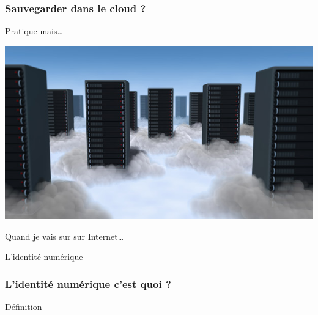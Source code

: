 \documentclass{beamer}
\begin{document}
\begin{frame}
\frametitle{Sauvegarder dans le cloud ?}

\begin{block}{Pratique mais…}
\begin{itemize}
\end{itemize}
\end{block}

\begin{center}
\includegraphics[scale=0.4] {./images/cloud_data_center.jpg}
\end{center}

\end{frame}

\begin{frame}
\begin{center}
\Huge{Quand je vais sur sur Internet…}
\end{center}
\end{frame}

\begin{frame}
\begin{center}
\Huge{L'identité numérique}
\end{center}
\end{frame}


\begin{frame}
\frametitle{L'identité numérique c'est quoi ?}


\begin{block}{Définition}
\begin{itemize}
\end{itemize}
\end{block}

\end{frame}
\end{document}
